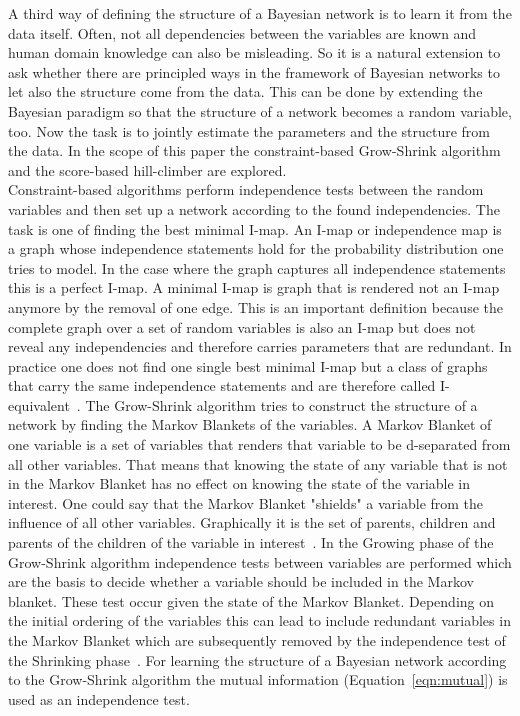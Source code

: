 A third way of defining the structure of a Bayesian network is to learn it from the data itself. Often, not all dependencies between the variables are known and human domain knowledge can also be misleading. So it is a natural extension to ask whether there are principled ways in the framework of Bayesian networks to let also the structure come from the data. This can be done by extending the Bayesian paradigm so that the structure of a network becomes a random variable, too. Now the task is to jointly estimate the parameters and the structure from the data. In the scope of this paper the constraint-based Grow-Shrink algorithm~\citep{margaritis2003} and the score-based hill-climber are explored.\\
Constraint-based algorithms perform independence tests between the random variables and then set up a network according to the found independencies. The task is one of finding the best minimal I-map. An I-map or independence map is a graph whose independence statements hold for the probability distribution one tries to model. In the case where the graph captures all independence statements this is a perfect I-map. A minimal I-map is graph that is rendered not an I-map anymore by the removal of one edge. This is an important definition because the complete graph over a set of random variables is also an I-map but does not reveal any independencies and therefore carries parameters that are redundant. In practice one does not find one single best minimal I-map but a class of graphs that carry the same independence statements and are therefore called I-equivalent~\citep{koller2009}. 
The Grow-Shrink algorithm tries to construct the structure of a network by finding the Markov Blankets of the variables. A Markov Blanket of one variable is a set of variables that renders that variable to be d-separated from all other variables. That means that knowing the state of any variable that is not in the Markov Blanket has no effect on knowing the state of the variable in interest. One could say that the Markov Blanket "shields" a variable from the influence of all other variables. Graphically it is the set of parents, children and parents of the children of the variable in interest~\citep{koller2009}. In the Growing phase of the Grow-Shrink algorithm independence tests between variables are performed which are the basis to decide whether a variable should be included in the Markov blanket. These test occur given the state of the Markov Blanket. Depending on the initial ordering of the variables this can lead to include redundant variables in the Markov Blanket which are subsequently removed by the independence test of the Shrinking phase~\citep{margaritis2003}. For learning the structure of a Bayesian network according to the Grow-Shrink algorithm the mutual information (Equation~\ref{eqn:mutual}) is used as an independence test.


